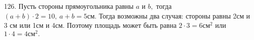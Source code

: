 126. Пусть стороны прямоугольника равны $a$ и $b,$ тогда $(a+b)\cdot2=10,\ a+b=5$см. Тогда возможны два случая: стороны равны 2см и 3 см или 1см и 4см. Поэтому площадь может быть равна $2\cdot3=6\text{см}^2$ или $1\cdot4=4\text{см}^2.$\\
